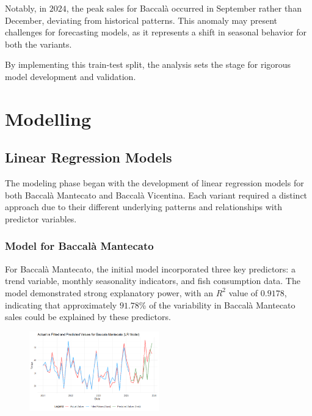 \documentclass[10pt,twocolumn,letterpaper]{article}
\begin{document}
Notably, in $2024$, the peak sales for Baccalà occurred in September rather than December, deviating from historical patterns. This anomaly may present challenges for forecasting models, as it represents a shift in seasonal behavior for both the variants.

By implementing this train-test split, the analysis sets the stage for rigorous model development and validation. 

\section{Modelling}
\subsection{Linear Regression Models}
The modeling phase began with the development of linear regression models for both Baccalà Mantecato and Baccalà Vicentina. Each variant required a distinct approach due to their different underlying patterns and relationships with predictor variables.

\subsubsection{Model for Baccalà Mantecato}
For Baccalà Mantecato, the initial model incorporated three key predictors: a trend variable, monthly seasonality indicators, and fish consumption data. The model demonstrated strong explanatory power, with an $R^2$ value of $0.9178$, indicating that approximately $91.78$\% of the variability in Baccalà Mantecato sales could be explained by these predictors.

\begin{figure}[H]
    \centering
    \includegraphics[width=0.5\textwidth]{PlotsBEFD/PRED_LR_MAN.png} 
    \caption{}
    \label{fig:PRED_LR_MAN}
\end{figure}
\end{document}

